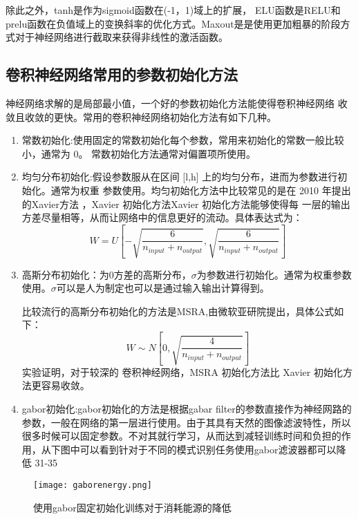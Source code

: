 除此之外，tanh是作为sigmoid函数在(-1，1)域上的扩展，
ELU函数是RELU和prelu函数在负值域上的变换斜率的优化方式。Maxout是是使用更加粗暴的阶段方式对于神经网络进行截取来获得非线性的激活函数。
\subsection{卷积神经网络常用的参数初始化方法}
神经网络求解的是局部最小值，一个好的参数初始化方法能使得卷积神经网络 收敛且收敛的更快。常用的卷积神经网络初始化方法有如下几种。
\begin{enumerate}
\item 常数初始化:使用固定的常数初始化每个参数，常用来初始化的常数一般比较小，通常为 0。 常数初始化方法通常对偏置项所使用。
\item 均匀分布初始化:假设参数服从在区间 [l,h] 上的均匀分布，进而为参数进行初始化。通常为权重 参数使用。均匀初始化方法中比较常见的是在 2010 年提出的Xavier\cite{XAVIER}方法 ，Xavier 初始化方法Xavier 初始化方法能够使得每 一层的输出方差尽量相等，从而让网络中的信息更好的流动。具体表达式为：
\begin{equation}{
W=U\left [ -\sqrt{\frac{6}{n_{input}+n_{output}}}, \sqrt{\frac{6}{n_{input}+n_{output}}} \right ]
}
\end{equation}

\item 高斯分布初始化：为0方差的高斯分布，$\sigma$为参数进行初始化。通常为权重参数使用。$\sigma$可以是人为制定也可以是通过输入输出计算得到。

比较流行的高斯分布初始化的方法是MSRA\cite{MSRA},由微软亚研院提出，具体公式如下：
\begin{equation}{
W \sim N\left [ 0, \sqrt{\frac{4}{n_{input}+n_{output}}}\right ]
}
\end{equation}
实验证明，对于较深的 卷积神经网络，MSRA 初始化方法比 Xavier 初始化方法更容易收敛。
\item gabor初始化\cite{GABOR}:gabor初始化的方法是根据gabar filter的参数直接作为神经网路的参数，一般在网络的第一层进行使用。由于其具有天然的图像滤波特性，所以很多时候可以固定参数。不对其就行学习，从而达到减轻训练时间和负担的作用，从下图中可以看到针对于不同的模式识别任务使用gabor滤波器都可以降低 31-35%
\end{enumerate}
\begin{figure}[h]
\centering
\texttt{[image: gaborenergy.png]}
\caption{使用gabor固定初始化训练对于消耗能源的降低}
\end{figure}

